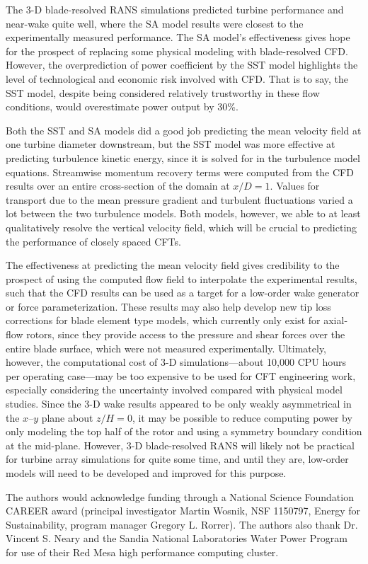 \documentclass[aip,graphicx]{revtex4-1}
\begin{document}
The 3-D blade-resolved RANS simulations predicted turbine performance and
near-wake quite well, where the SA model results were closest to the
experimentally measured performance. The SA model's effectiveness gives hope for
the prospect of replacing some physical modeling with blade-resolved CFD.
However, the  overprediction of power coefficient by the SST model highlights
the level of technological and economic risk involved with CFD. That is to say,
the SST model, despite being considered relatively trustworthy in these flow
conditions, would overestimate power output by 30\%.

Both the SST and SA models did a good job predicting the mean velocity field at
one turbine diameter downstream, but the SST model was more effective at
predicting turbulence kinetic energy, since it is solved for in the turbulence
model equations. Streamwise momentum recovery terms were computed from the CFD
results over an entire cross-section of the domain at $x/D=1$. Values for
transport due to the mean pressure gradient and turbulent fluctuations varied a
lot between the two turbulence models. Both models, however, we able to at least
qualitatively resolve the vertical velocity field, which will be crucial to
predicting the performance of closely spaced CFTs.

The effectiveness at predicting the mean velocity field gives credibility to the
prospect of using the computed flow field to interpolate the experimental
results, such that the CFD results can be used as a target for a low-order wake
generator or force parameterization. These results may also help develop new tip
loss corrections for blade element type models, which currently only exist for
axial-flow rotors, since they provide access to the pressure and shear forces
over the entire blade surface, which were not measured experimentally.
Ultimately, however, the computational cost of 3-D simulations---about 10,000
CPU hours per operating case---may be too expensive to be used for CFT
engineering work, especially considering the uncertainty involved compared with
physical model studies. Since the 3-D wake results appeared to be only weakly
asymmetrical in the $x$--$y$ plane about $z/H=0$, it may be possible to reduce
computing power by only modeling the top half of the rotor and using a symmetry
boundary condition at the mid-plane. However, 3-D blade-resolved RANS will
likely not be practical for turbine array simulations for quite some time, and
until they are, low-order models will need to be developed and improved for this
purpose.


\begin{acknowledgments}
    The authors would acknowledge funding through a National Science Foundation
    CAREER award (principal investigator Martin Wosnik, NSF 1150797, Energy for
    Sustainability, program manager Gregory L. Rorrer). The authors also thank
    Dr. Vincent S. Neary and the Sandia National Laboratories Water Power
    Program for use of their Red Mesa high performance computing cluster.
\end{acknowledgments}


\end{document}
